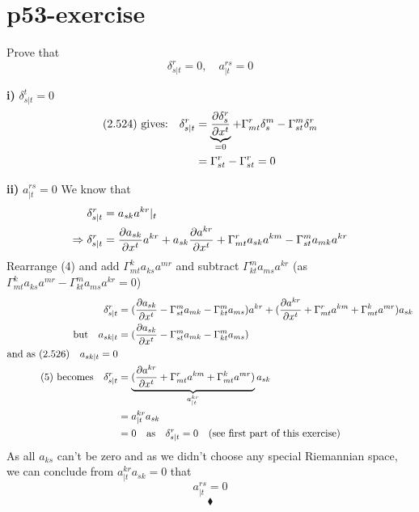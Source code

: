 \section{p53-exercise}
\begin{tcolorbox}
Prove that $$\delta^r_{s|t} = 0, \quad a^{rs}_{|t} = 0$$
\end{tcolorbox}

\textbf{i)} $\delta^t_{s|t} = 0$
\begin{align}
\text{(2.524) gives:}\quad \delta^r_{s|t} &= \underbrace{\pdv{\delta^r_{s}}{x^t}}_\text{=0} + \Gamma^r_{mt}\delta^m_{s}- \Gamma^m_{st}\delta^r_{m}\\
&= \Gamma^r_{st}- \Gamma^r_{st} = 0
\end{align}

\textbf{ii)} $ a^{rs}_{|t} = 0$
We know that 
\begin{align}
\delta^r_{s|t} &= a_{sk}a^{kr}|_{t}\\
\Rightarrow \delta^r_{s|t} &= \pdv{a_{sk}}{x^t}a^{kr}+ a_{sk}\pdv{a^{kr} }{x^t} + \Gamma^r_{mt}a_{sk}a^{km}- \Gamma^m_{st}a_{mk}a^{kr}
\end{align}
Rearrange (4) and add $\Gamma^k_{mt}a_{ks}a^{mr}$ and subtract $\Gamma^m_{kt}a_{ms}a^{kr}$ (as $\Gamma^k_{mt}a_{ks}a^{mr} - \Gamma^m_{kt}a_{ms}a^{kr}  =0 $)
\begin{align}
\delta^r_{s|t} &= (\pdv{a_{sk}}{x^t}- \Gamma^m_{st}a_{mk}-\Gamma^m_{kt}a_{ms} )a^{kr}+ (\pdv{a^{kr} }{x^t} + \Gamma^r_{mt}a^{km}+ \Gamma^k_{mt}a^{mr})a_{sk}\\
\text{but} \quad  a_{sk|t} &= (\pdv{a_{sk}}{x^t}- \Gamma^m_{st}a_{mk}-\Gamma^m_{kt}a_{ms})\\
\text{and as (2.526)}\quad a_{sk|t} = 0\\
\text{(5) becomes}\quad \delta^r_{s|t} &= \underbrace{(\pdv{a^{kr} }{x^t} + \Gamma^r_{mt}a^{km}+ \Gamma^k_{mt}a^{mr})}_{\begin{huge}a^{kr}_{|t}\end{huge}}a_{sk}\\
\ &= a^{kr}_{|t}a_{sk}\\
\ &= 0 \quad \text{as}\quad \delta^r_{s|t}=0  \quad \text{(see first  part of this exercise)}
\end{align}
As all $a_{ks}$ can't be zero and as we didn't choose any special Riemannian space, we can conclude from $ a^{kr}_{|t}a_{sk} = 0$ that $$ a^{rs}_{|t} = 0$$ 
$$\blacklozenge$$
\newpage

